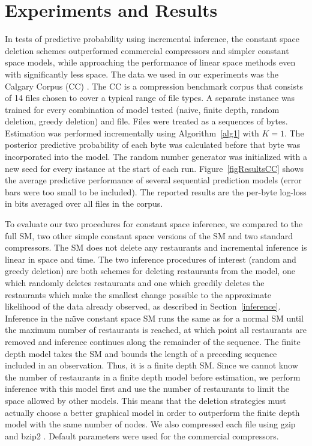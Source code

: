 \section{Experiments and Results}
\label{results}

In tests of predictive probability using incremental inference, the constant space deletion schemes outperformed commercial compressors and simpler constant space models, while approaching the performance of linear space methods even with significantly less space.  The data we used in our experiments was the Calgary Corpus (CC) \cite{Bell1989}.  The CC is a compression benchmark corpus that consists of 14 files chosen to cover a typical range of file types.  A separate instance was trained for every combination of model tested (naive, finite depth, random deletion, greedy deletion) and file.  Files were treated as a sequences of bytes.  Estimation was performed incrementally using Algorithm~\ref{alg1} with $K=1$. The posterior predictive probability of each byte was calculated before that byte was incorporated into the model.  The random number generator was initialized with a new seed for every instance at the start of each run.  Figure~\ref{figResultsCC} shows the average predictive performance of several sequential prediction models (error bars were too small to be included).  The reported results are the per-byte log-loss in bits averaged over all files in the corpus.  

To evaluate our two procedures for constant space inference, we compared to the full SM, two other simple constant space versions of the SM and two standard compressors.  The SM does not delete any restaurants and incremental inference is linear in space and time.  The two inference procedures of interest (random and greedy deletion) are both schemes for deleting restaurants from the model, one which randomly deletes restaurants and one which greedily deletes the restaurants which make the smallest change possible to the approximate likelihood of the data already observed, as described in Section~\ref{inference}.  Inference in the na\"{\i}ve constant space SM runs the same as for a normal SM until the maximum number of restaurants is reached, at which point all restaurants are removed and inference continues along the remainder of the sequence.  The finite depth model takes the SM and bounds the length of a preceding sequence included in an observation.  Thus, it is a finite depth SM. Since we cannot know the number of restaurants in a finite depth model before estimation, we perform inference with this model first and use the number of restaurants to limit the space allowed by other models. This means that the deletion strategies must actually choose a better graphical model in order to outperform the finite depth model with the same number of nodes. We also compressed each file using gzip and bzip2 \cite{Deutsch1996, Seward1999}.  Default parameters were used for the commercial compressors.

